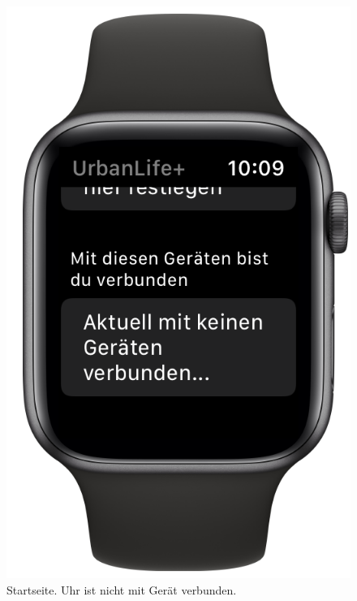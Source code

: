 \begin{minipage}{.45\textwidth}
	\begin{figure}[H]
		\centering
		\includegraphics[width=.68\textwidth]{./images/prototype/watchos/homeNotConnected.png}
		\caption{\label{fig:app:watchos:homeNotConnected}Startseite. Uhr ist nicht mit Gerät verbunden.}
	\end{figure}
\end{minipage}\hfill
